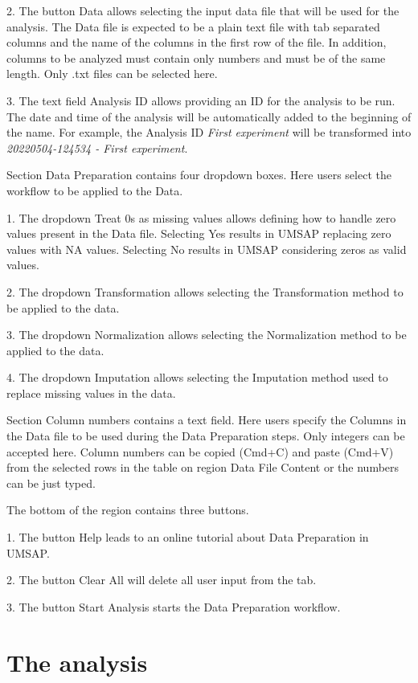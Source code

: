 \num{2}. The button Data allows selecting the input
data file that will be used for the analysis. The Data file is expected to be a
plain text file with tab separated columns and the name of the columns in the first
row of the file. In addition, columns to be analyzed must contain only numbers and
must be of the same length. Only .txt files can be selected here.

\num{3}. The text field Analysis ID allows providing an ID for the analysis
to be run. The date and time of the analysis will be automatically added to the
beginning of the name. For example, the Analysis ID \textit{First experiment} will
be transformed into \textit{20220504-124534 - First experiment}.

Section Data Preparation contains four dropdown boxes. Here users select the workflow
to be applied to the Data.

\num{1}. The dropdown Treat \num{0}s as missing values allows defining how
to handle zero values present in the Data file. Selecting Yes results in UMSAP
replacing zero values with NA values. Selecting No results in UMSAP considering
zeros as valid values.

\num{2}. The dropdown Transformation allows selecting the Transformation method
to be applied to the data.

\num{3}. The dropdown Normalization allows selecting the Normalization method
to be applied to the data.

\num{4}. The dropdown Imputation allows selecting the Imputation method used
to replace missing values in the data.

Section Column numbers contains a text field. Here users specify the Columns in the
Data file to be used during the Data Preparation steps. Only integers can be accepted
here. Column numbers can be copied (Cmd+C) and paste (Cmd+V) from the selected rows
in the table on region Data File Content or the numbers can be just typed.

The bottom of the region contains three buttons.

\num{1}. The button Help leads to an online tutorial about Data Preparation in
UMSAP.

\num{2}. The button Clear All will delete all user input from the tab.

\num{3}. The button Start Analysis starts the Data Preparation workflow.

\section{The analysis}

